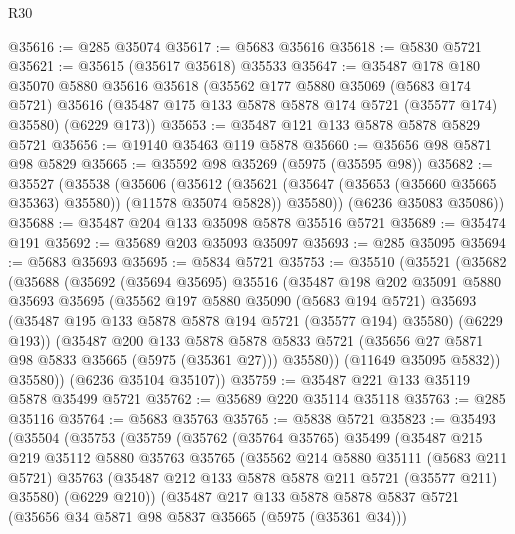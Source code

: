 \begin{lexlean}{R30}
\begin{coremodule}
@35616 := @285 @35074
@35617 := @5683 @35616
@35618 := @5830 @5721
@35621 := @35615 (@35617 @35618) @35533
@35647 := @35487
    @178
    @180
    @35070
    @5880
    @35616
    @35618
    (@35562
      @177
      @5880
      @35069
      (@5683 @174 @5721)
      @35616
      (@35487 @175 @133 @5878 @5878 @174 @5721 (@35577 @174) @35580)
      (@6229 @173))
@35653 := @35487 @121 @133 @5878 @5878 @5829 @5721
@35656 := @19140 @35463 @119 @5878
@35660 := @35656 @98 @5871 @98 @5829
@35665 := @35592 @98 @35269 (@5975 (@35595 @98))
@35682 := @35527
    (@35538
      (@35606
        (@35612
          (@35621 (@35647 (@35653 (@35660 @35665 @35363) @35580)) (@11578 @35074 @5828))
          @35580))
      (@6236 @35083 @35086))
@35688 := @35487 @204 @133 @35098 @5878 @35516 @5721
@35689 := @35474 @191
@35692 := @35689 @203 @35093 @35097
@35693 := @285 @35095
@35694 := @5683 @35693
@35695 := @5834 @5721
@35753 := @35510
    (@35521
      (@35682
        (@35688
          (@35692
            (@35694 @35695)
            @35516
            (@35487
              @198
              @202
              @35091
              @5880
              @35693
              @35695
              (@35562
                @197
                @5880
                @35090
                (@5683 @194 @5721)
                @35693
                (@35487 @195 @133 @5878 @5878 @194 @5721 (@35577 @194) @35580)
                (@6229 @193))
              (@35487
                @200
                @133
                @5878
                @5878
                @5833
                @5721
                (@35656 @27 @5871 @98 @5833 @35665 (@5975 (@35361 @27)))
                @35580))
            (@11649 @35095 @5832))
          @35580))
      (@6236 @35104 @35107))
@35759 := @35487 @221 @133 @35119 @5878 @35499 @5721
@35762 := @35689 @220 @35114 @35118
@35763 := @285 @35116
@35764 := @5683 @35763
@35765 := @5838 @5721
@35823 := @35493
    (@35504
      (@35753
        (@35759
          (@35762
            (@35764 @35765)
            @35499
            (@35487
              @215
              @219
              @35112
              @5880
              @35763
              @35765
              (@35562
                @214
                @5880
                @35111
                (@5683 @211 @5721)
                @35763
                (@35487 @212 @133 @5878 @5878 @211 @5721 (@35577 @211) @35580)
                (@6229 @210))
              (@35487
                @217
                @133
                @5878
                @5878
                @5837
                @5721
                (@35656 @34 @5871 @98 @5837 @35665 (@5975 (@35361 @34)))

\end{coremodule}
\end{lexlean}
